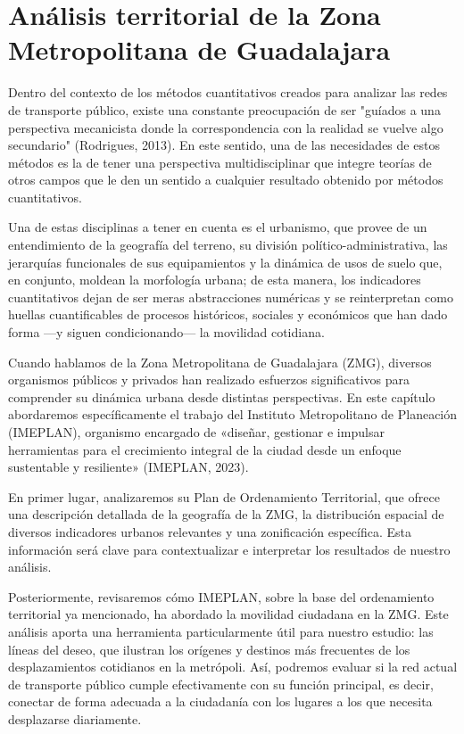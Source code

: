 \documentclass[openany]{book}
\begin{document}

\chapter{Análisis territorial de la Zona Metropolitana de Guadalajara}
	Dentro del contexto de los métodos cuantitativos creados para analizar las redes de transporte público, existe una constante preocupación de ser "guíados a una perspectiva mecanicista donde la correspondencia con la realidad se vuelve algo secundario" (Rodrigues, 2013). En este sentido, una de las necesidades de estos métodos es la de tener una perspectiva multidisciplinar que integre teorías de otros campos que le den un sentido a cualquier resultado obtenido por métodos cuantitativos.

	Una de estas disciplinas a tener en cuenta es el urbanismo, que provee de un entendimiento de la geografía del terreno, su división político-administrativa, las jerarquías funcionales de sus equipamientos y la dinámica de usos de suelo que, en conjunto, moldean la morfología urbana; de esta manera, los indicadores cuantitativos dejan de ser meras abstracciones numéricas y se reinterpretan como huellas cuantificables de procesos históricos, sociales y económicos que han dado forma —y siguen condicionando— la movilidad cotidiana.

	Cuando hablamos de la Zona Metropolitana de Guadalajara (ZMG), diversos organismos públicos y privados han realizado esfuerzos significativos para comprender su dinámica urbana desde distintas perspectivas. En este capítulo abordaremos específicamente el trabajo del Instituto Metropolitano de Planeación (IMEPLAN), organismo encargado de «diseñar, gestionar e impulsar herramientas para el crecimiento integral de la ciudad desde un enfoque sustentable y resiliente» (IMEPLAN, 2023).

	En primer lugar, analizaremos su Plan de Ordenamiento Territorial, que ofrece una descripción detallada de la geografía de la ZMG, la distribución espacial de diversos indicadores urbanos relevantes y una zonificación específica. Esta información será clave para contextualizar e interpretar los resultados de nuestro análisis.

	Posteriormente, revisaremos cómo IMEPLAN, sobre la base del ordenamiento territorial ya mencionado, ha abordado la movilidad ciudadana en la ZMG. Este análisis aporta una herramienta particularmente útil para nuestro estudio: las líneas del deseo, que ilustran los orígenes y destinos más frecuentes de los desplazamientos cotidianos en la metrópoli. Así, podremos evaluar si la red actual de transporte público cumple efectivamente con su función principal, es decir, conectar de forma adecuada a la ciudadanía con los lugares a los que necesita desplazarse diariamente.
\end{document}
